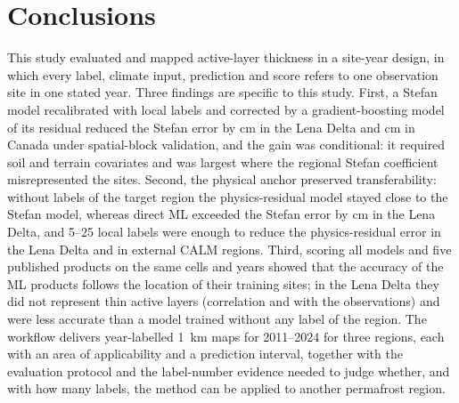 \section{Conclusions}\label{sec:conclusions}
This study evaluated and mapped active-layer thickness in a site-year design, in which every label, climate input, prediction and score refers to one observation site in one stated year. Three findings are specific to this study. First, a Stefan model recalibrated with local labels and corrected by a gradient-boosting model of its residual reduced the Stefan error by \ndrefLeblkRoabs{} cm in the Lena Delta and \ndrefCablkRoabs{} cm in Canada under spatial-block validation, and the gain was conditional: it required soil and terrain covariates and was largest where the regional Stefan coefficient misrepresented the sites. Second, the physical anchor preserved transferability: without labels of the target region the physics-residual model stayed close to the Stefan model, whereas direct ML exceeded the Stefan error by \ndrefLeregDzabs{} cm in the Lena Delta, and 5--25 local labels were enough to reduce the physics-residual error in the Lena Delta and in external CALM regions. Third, scoring all models and five published products on the same cells and years showed that the accuracy of the ML products follows the location of their training sites; in the Lena Delta they did not represent thin active layers (correlation \nrLeWei{} and \nrLeLiu{} with the observations) and were less accurate than a model trained without any label of the region. The workflow delivers year-labelled 1~km maps for 2011--2024 for three regions, each with an area of applicability and a prediction interval, together with the evaluation protocol and the label-number evidence needed to judge whether, and with how many labels, the method can be applied to another permafrost region.
